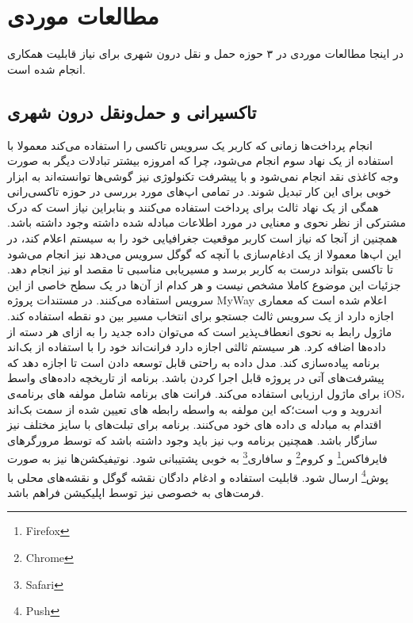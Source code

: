 \section{مطالعات موردی}
در اینجا مطالعات موردی در ۳ حوزه حمل و نقل درون شهری برای نیاز قابلیت همکاری انجام شده است. 


\subsection{تاکسیرانی و حمل‌و‌نقل درون شهری}

انجام پرداخت‌ها زمانی که کاربر یک سرویس تاکسی را استفاده می‌کند معمولا با استفاده از یک نهاد سوم انجام می‌شود، چرا که امروزه بیشتر تبادلات دیگر به صورت وجه کاغذی نقد انجام نمی‌شود و با پیشرفت تکنولوژی نیز گوشی‌ها توانسته‌اند به ابزار خوبی برای این کار تبدیل شوند. در تمامی اپ‌های مورد بررسی در حوزه تاکسی‌رانی همگی از یک نهاد ثالث برای پرداخت استفاده می‌کنند \cite{payment} و بنابراین نیاز است که درک مشترکی از نظر نحوی و معنایی در مورد اطلاعات مبادله شده داشته وجود داشته باشد.
همچنین از آنجا که نیاز است کاربر موقعیت جغرافیایی خود را به سیستم اعلام کند، در این اپ‌ها معمولا از یک ادغام‌سازی با آنچه که گوگل سرویس ‌می‌دهد نیز انجام می‌شود تا تاکسی بتواند درست به کاربر برسد و مسیریابی مناسبی تا مقصد او نیز انجام دهد. جزئیات این موضوع کاملا مشخص نیست و هر کدام از آن‌ها در یک سطح خاصی از این سرویس استفاده می‌کنند.
در مستندات پروژه MyWay اعلام شده است که معماری اجازه دارد از یک سرویس ثالث جستجو برای انتخاب مسیر بین دو نقطه استفاده کند. ماژول رابط به نحوی انعطاف‌پذیر است که می‌توان داده جدید را به ازای هر دسته از داده‌ها اضافه کرد. هر سیستم ثالثی اجازه دارد فرانت‌اند خود را با استفاده از بک‌اند برنامه پیاده‌سازی کند. مدل داده به راحتی قابل توسعه دادن است تا اجازه دهد که پیشرفت‌های آتی در پروژه قابل اجرا کردن باشد. برنامه از تاریخچه داده‌های واسط برای ماژول ارزیابی استفاده می‌کند. فرانت های برنامه شامل مولفه های برنامه‌ی iOS، اندروید و وب است؛که این مولفه به واسطه رابطه های تعیین شده از سمت بک‌اند اقتدام به مبادله ی داده های خود می‌کنند. برنامه برای تبلت‌های با سایز مختلف نیز سازگار باشد. همچنین برنامه وب نیز باید وجود داشته باشد که توسط مرورگرهای فایرفاکس\footnote{Firefox} و کروم\footnote{Chrome} و سافاری\footnote{Safari} به خوبی پشتیبانی شود.
نوتیفیکشن‌ها نیز به صورت پوش\footnote{Push} ارسال شود.
قابلیت استفاده و ادغام دادگان نقشه گوگل و نقشه‌های محلی با فرمت‌های به خصوصی نیز توسط اپلیکیشن فراهم باشد.


